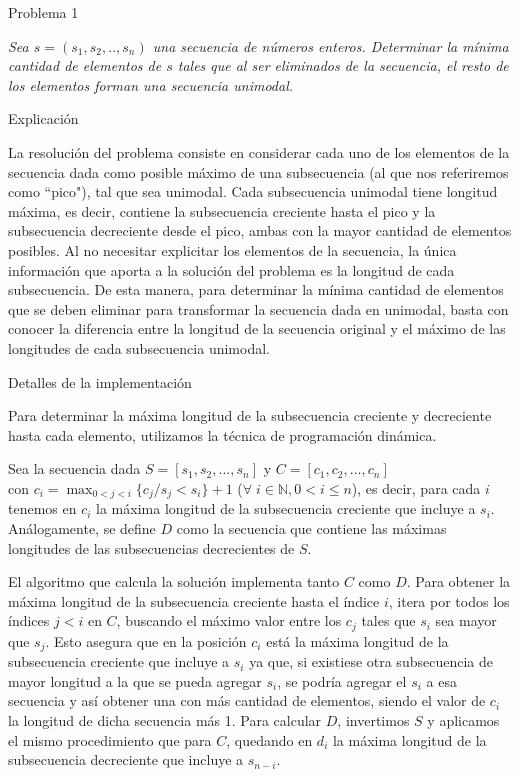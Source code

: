 \begin{section}{Problema 1}

	\textit{Sea $s = (s_1,s_2,..,s_n)$ una secuencia de números enteros. Determinar la mínima cantidad de elementos de $s$ tales que al ser eliminados de la secuencia, el resto de los elementos forman una secuencia unimodal.}

	\begin{subsection}{Explicación}

		La resolución del problema consiste en considerar cada uno de los elementos de la secuencia dada como
		posible máximo de una subsecuencia (al que nos referiremos como ``pico"), tal que sea unimodal. Cada 
		subsecuencia unimodal tiene longitud máxima, es decir, contiene la subsecuencia creciente hasta el pico
		y la subsecuencia decreciente desde el pico, ambas con la mayor cantidad de elementos posibles. Al no
		necesitar explicitar los elementos de la secuencia, la única información que aporta a la solución del
		problema es la longitud de cada subsecuencia. De esta manera, para determinar la mínima cantidad de
		elementos que se deben eliminar para transformar la secuencia dada en unimodal, basta con conocer
		la diferencia entre la longitud de la secuencia original y el máximo de las longitudes de cada
		subsecuencia unimodal. 		

	\end{subsection}

	\newpage

	\begin{subsection}{Detalles de la implementación}
		
		Para determinar la máxima longitud de la subsecuencia creciente y decreciente hasta cada elemento,
		utilizamos la técnica de programación dinámica.
		
		Sea la secuencia dada $S=[s_1,s_2,...,s_n]$ y $C=[c_1,c_2,...,c_n]$ \\
		con $c_i=\displaystyle\max_{0<j<i}\{ c_j / s_j < s_i \}+1$ ($\forall\;i\in\mathbb{N}, 0<i\leq n$), es 
		decir, para cada $i$ tenemos en $c_i$ la máxima longitud de la subsecuencia creciente que incluye a
		$s_i$. Análogamente, se define $D$ como la secuencia que contiene las máximas longitudes de las
		subsecuencias decrecientes de $S$.
		
		El algoritmo que calcula la solución implementa tanto $C$ como $D$.	
		Para obtener la máxima longitud de la subsecuencia creciente hasta el índice $i$, itera
		por todos los índices $j<i$ en $C$, buscando el máximo valor entre los $c_j$ tales que $s_i$ sea mayor
		que	$s_j$. 
		Esto asegura que en la posición $c_i$ está la máxima longitud de la subsecuencia creciente
		que incluye a $s_i$ ya que, si existiese otra subsecuencia de mayor longitud a la que se pueda 
		agregar $s_i$, se podría agregar el $s_i$ a esa secuencia y así obtener una con más cantidad de 
		elementos, siendo el valor de $c_i$ la longitud de dicha secuencia más 1. Para calcular $D$,
		invertimos $S$ y aplicamos el mismo	procedimiento que para $C$, quedando en $d_i$ la máxima longitud
		de la subsecuencia decreciente que incluye a $s_{n-i}$.


\end{subsection}
\end{section}
